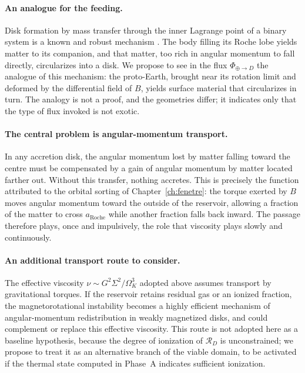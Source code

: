 \documentclass[11pt,a4paper,openany]{report}
\newcommand{\aR}{a_{\mathrm{Roche}}}
\newcommand{\RD}{\mathcal{R}_{D}}
\begin{document}
\paragraph{An analogue for the feeding.} Disk formation by mass transfer through the inner Lagrange
point of a binary system is a known and robust mechanism \cite{FrankKingRaine2002}. The body filling
its Roche lobe yields matter to its companion, and that matter, too rich in angular momentum to fall
directly, circularizes into a disk. We propose to see in the flux $\Phi_{\oplus\to D}$ the analogue
of this mechanism: the proto-Earth, brought near its rotation limit and deformed by the differential
field of $B$, yields surface material that circularizes in turn. The analogy is not a proof, and the
geometries differ; it indicates only that the type of flux invoked is not exotic.

\paragraph{The central problem is angular-momentum transport.} In any accretion disk, the angular
momentum lost by matter falling toward the centre must be compensated by a gain of angular momentum
by matter located farther out. Without this transfer, nothing accretes. This is precisely the
function attributed to the orbital sorting of Chapter~\ref{ch:fenetre}: the torque exerted by $B$
moves angular momentum toward the outside of the reservoir, allowing a fraction of the matter to
cross $\aR$ while another fraction falls back inward. The passage therefore plays, once and
impulsively, the role that viscosity plays slowly and continuously.

\paragraph{An additional transport route to consider.} The effective viscosity
$\nu\sim G^2\Sigma^2/\Omega_K^3$ adopted above assumes transport by gravitational torques. If the
reservoir retains residual gas or an ionized fraction, the magnetorotational instability
\cite{BalbusHawley1991} becomes a highly efficient mechanism of angular-momentum redistribution in
weakly magnetized disks, and could complement or replace this effective viscosity. This route is not
adopted here as a baseline hypothesis, because the degree of ionization of $\RD$ is unconstrained;
we propose to treat it as an alternative branch of the viable domain, to be activated if the thermal
state computed in Phase~A indicates sufficient ionization.
\end{document}
